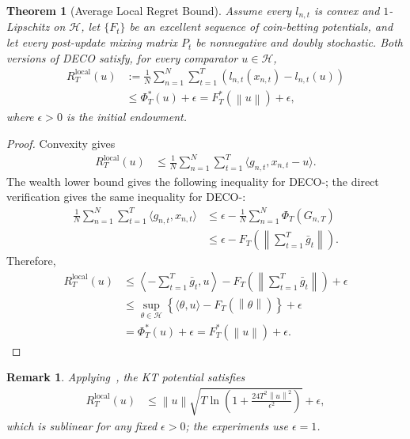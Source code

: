 \documentclass[journal]{IEEEtran}
\newtheorem{theorem}{Theorem}
\newtheorem{remark}{Remark}
\newcommand{\br}[1]{\left(#1\right)}
\newcommand{\norm}[1]{\left\lVert{#1}\right\rVert}
\newcommand{\Hil}{\mathcal{H}} %
\newcommand{\algname}{{DECO}\xspace}
\begin{document}
{\color{blue}
    \begin{theorem}[Average Local Regret Bound]\label{thm:local_avg_regret_bound}
        Assume every $l_{n,t}$ is convex and $1$-Lipschitz on $\Hil$, let $\{F_t\}$ be an excellent sequence of coin-betting potentials, and let every post-update mixing matrix $P_t$ be nonnegative and doubly stochastic.
        Both versions of \algname{} satisfy, for every comparator $u\in\Hil$,
        \begin{align}
            R_T^{\text{local}}(u) & := \frac{1}{N} \sum_{n=1}^N \sum_{t=1}^T
            \br{l_{n,t}(x_{n,t})-l_{n,t}(u)}                                 \\
                                  & \leq \Phi_T^*(u)+\epsilon
            =F_T^*(\norm{u})+\epsilon,
        \end{align}
        where $\epsilon>0$ is the initial endowment.
    \end{theorem}
    \begin{proof}
        Convexity gives
        \begin{align*}
            R_T^{\mathrm{local}}(u)
             & \leq \frac{1}{N} \sum_{n=1}^N \sum_{t=1}^T
            \langle g_{n,t},x_{n,t}-u\rangle.
        \end{align*}
        The wealth lower bound gives the following inequality for \algname{}-; the direct verification gives the same inequality for \algname{}-:
        \begin{align}
            \frac{1}{N} \sum_{n=1}^N \sum_{t=1}^T \langle g_{n,t}, x_{n,t} \rangle
             & \leq\epsilon-\frac{1}{N}\sum_{n=1}^{N}\Phi_T(G_{n,T})     \\
             & \leq\epsilon-F_T\left(\norm{\sum_{t=1}^T\bar g_t}\right).
        \end{align}
        Therefore,
        \begin{align}
            R_T^{\mathrm{local}}(u)
             & \leq\left\langle-\sum_{t=1}^T\bar g_t,u\right\rangle
            -F_T\left(\norm{\sum_{t=1}^T\bar g_t}\right)+\epsilon             \\
             & \leq\sup_{\theta\in\Hil}
            \left\{\langle\theta,u\rangle-F_T(\norm{\theta})\right\}+\epsilon \\
             & =\Phi_T^*(u)+\epsilon
            =F_T^*(\norm{u})+\epsilon.
        \end{align}
    \end{proof}
    \begin{remark}
        Applying~\cite[Corollary 5]{orabona_coin_2016}, the KT potential satisfies
        \begin{align*}
            R_T^{\text{local}}(u) & \leq \norm{u} \sqrt{T \ln \br{1 + \frac{24T^2 \norm{u}^2}{\epsilon^2}}} + \epsilon,
        \end{align*}
        which is sublinear for any fixed $\epsilon>0$; the experiments use $\epsilon=1$.
    \end{remark}
}
\end{document}

